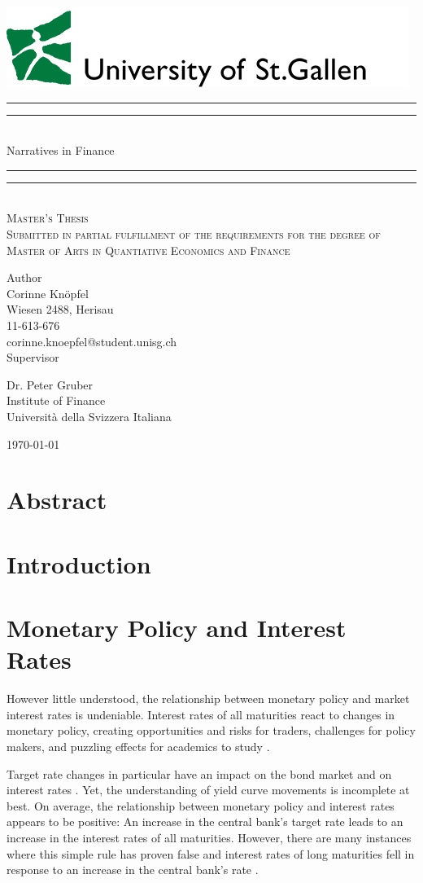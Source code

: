 \documentclass[11pt,a4paper,english,oneside]{book}
\makeatletter
\newcommand*{\plogo}{\includegraphics[scale=0.7]{Images/HSG_logo}}
\numberwithin{equation}{chapter}
\newcommand*{\titleGP}{\begingroup %
\centering %
\vspace*{\baselineskip} %
\plogo\\[2\baselineskip] %
\rule{\textwidth}{1.6pt}\vspace*{-\baselineskip}\vspace*{2pt} %
\rule{\textwidth}{0.4pt}\\[\baselineskip] %
{\LARGE Narratives in Finance }\\[0.2\baselineskip] %
\rule{\textwidth}{0.4pt}\vspace*{-\baselineskip}\vspace{3.2pt} %
\rule{\textwidth}{1.6pt}\\[2\baselineskip] %
\scshape %
Master's Thesis\\[2\baselineskip]
Submitted in partial fulfillment of the requirements for the degree of Master of Arts in Quantiative Economics and Finance \par
\vspace*{2\baselineskip}
Author\\
{\Large Corinne Knöpfel \\ [5pt]
 }
Wiesen 2488, Herisau \\[5pt]
11-613-676\\[5pt]
corinne.knoepfel@student.unisg.ch \\


\vspace*{2\baselineskip}
Supervisor\\
{\Large Dr. Peter Gruber\\[5pt]%
\small Institute of Finance\\[5pt]Universit\`{a} della Svizzera Italiana\par}
\vfill
{\scshape %
	\today } \\[0.3\baselineskip]
\endgroup}
\makeatother
\begin{document}
\thispagestyle{empty}
\titleGP
\newpage
\doublespacing
\setcounter{page}{1}
\thispagestyle{firststyle}


\chapter*{Abstract}

{\pagestyle{firststyle}
\tableofcontents
\cleardoublepage
}

\listoffigures
\listoftables

\newpage


\chapter{Introduction}
 

\chapter{Monetary Policy and Interest Rates} \label{MonetaryPolicy}
 
\noindent However little understood, the relationship between monetary policy and market interest rates is undeniable. Interest rates of all maturities react to changes in monetary policy, creating opportunities and risks for traders, challenges for policy makers, and puzzling effects for academics to study \citep[p. 1594]{Ellingsen.2001}. 

Target rate changes in particular have an impact on the bond market and on interest rates \citep[p. 332]{Cook.1989}. %
Yet, the understanding of yield curve movements is incomplete at best. On average, the relationship between monetary policy and interest rates appears to be positive: An increase in the central bank's target rate leads to an increase in the interest rates of all maturities. However, there are many instances where this simple rule has proven false and interest rates of long maturities fell in response to an increase in the central bank's rate \citep[p. 1594]{Ellingsen.2001}. 
\end{document}
